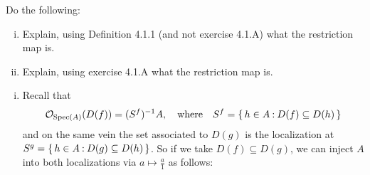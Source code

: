 \documentclass[12pt]{memoir}
\begin{document}
    \begin{Ej}[Restrictions]
        Do the following:
        \begin{enumerate}[i)]
            \itemsep=-0.4em
            \item Explain, using Definition 4.1.1 (and not exercise 4.1.A) what the restriction map is.
            \item Explain, using exercise 4.1.A what the restriction map is.
        \end{enumerate}
    \end{Ej}
    
    \begin{ptcbr}
        \iffalse
Let us begin by calling 
$$S^f=\set{h\in A\:\ D(f)\subseteq D(h)}$$
and likewise for $S^g$. Using this set, our definition for the structure sheaf is $\cO_{\Spec(A)}(D(f))=(S^f)^{-1}A$.\par 
Recall that from the previous exercise we have that $D(f)\subseteq D(h)$ is equivalent to saying that $h$ is invertible in $A_f$:
$$\frac{1}{h}=\frac{a}{f^n},\word{for}n\in\bN\word{and}a\in A.$$
So in terms of a relation between $S^f$ and $S^g$, given that $D(f)\subseteq D(g)$, we can see that $S^g\subseteq S^f$:
$$h\in S^g\To \frac1h=\frac{a}{g^n}\To \frac1h=a\left(\frac{b}{f^m}\right)^n=\frac{ab^n}{f^{mn}}\To h\in S^f.$$
Thus when localizing we have $(S^g)^{-1}A\supseteq (S^f)^{-1}A$, which means that it does make sense to restrict from $\cO_{\Spec(A)}(D(g))$ to $\cO_{\Spec(A)}(D(f))$.
\fi
    \begin{enumerate}[i)]
        \itemsep=-0.4em
        \item Recall that 
    $$\mathcal{O}_{\operatorname{Spec}(A)}(D(f))=(S^f)^{-1}A,\quad\text{where}\quad S^f=\{\,h\in A\mathbin{:} D(f)\subseteq D(h)\,\}$$
    and on the same vein the set associated to $D(g)$ is the localization at $S^g=\{\,h\in A\mathbin{:} D(g)\subseteq D(h)\,\}$. So if we take $D(f)\subseteq D(g)$, we can inject $A$ into both localizations via $a\mapsto\frac{a}{1}$ as follows:
    \begin{center}

\end{center}
\end{enumerate}
\end{ptcbr}
\end{document}
